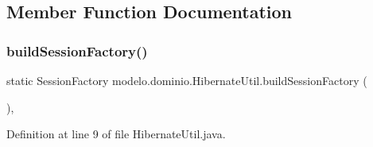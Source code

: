 \subsection{Member Function Documentation}
\mbox{\label{classmodelo_1_1dominio_1_1HibernateUtil_a6a87317e9238a2010699289fbbc9be91}} 
\subsubsection{\texorpdfstring{buildSessionFactory()}{buildSessionFactory()}}
{\footnotesize\ttfamily static Session\+Factory modelo.\+dominio.\+Hibernate\+Util.\+build\+Session\+Factory (\begin{DoxyParamCaption}{ }\end{DoxyParamCaption})\hspace{0.3cm}{\ttfamily [static]}, {\ttfamily [private]}}



Definition at line 9 of file Hibernate\+Util.\+java.


